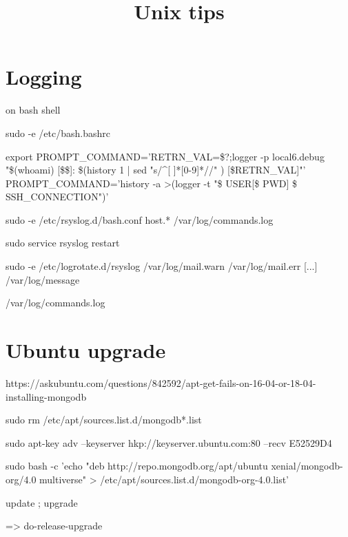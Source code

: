 


\title{Unix tips}



\date{}


\maketitle

\justify

\renewcommand{\abstractname}{}

\begin{abstract}

\end{abstract}




\section*{Logging}

on bash shell

sudo -e /etc/bash.bashrc

export PROMPT_COMMAND='RETRN_VAL=\$?;logger -p local6.debug "\$(whoami) [\$\$]: \$(history 1 | sed "s/^[ ]*[0-9]\+[ ]*//" ) [\$RETRN_VAL]"'
PROMPT_COMMAND='history -a >(logger -t "\$ USER[\$ PWD] \$ SSH_CONNECTION")'

sudo -e /etc/rsyslog.d/bash.conf
   host.*    /var/log/commands.log

sudo service rsyslog restart

sudo -e /etc/logrotate.d/rsyslog
/var/log/mail.warn
/var/log/mail.err
[...]
/var/log/message

/var/log/commands.log



\section*{Ubuntu upgrade}

https://askubuntu.com/questions/842592/apt-get-fails-on-16-04-or-18-04-installing-mongodb

sudo rm /etc/apt/sources.list.d/mongodb*.list

sudo apt-key adv --keyserver hkp://keyserver.ubuntu.com:80 --recv E52529D4

sudo bash -c 'echo "deb http://repo.mongodb.org/apt/ubuntu xenial/mongodb-org/4.0 multiverse" > /etc/apt/sources.list.d/mongodb-org-4.0.list'

update ; upgrade 

=> do-release-upgrade













